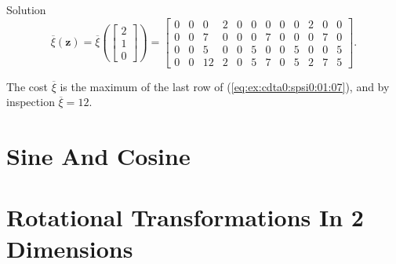 \begin{vworkexampleparsection}{Solution}
\begin{equation}
\label{eq:ex:cdta0:spsi0:01:07}
\overline{\xi}(\mathbf{z})
= 
\overline{\xi}\left(\left[\begin{array}{c}2\\1\\0\end{array}\right]\right)
=
\left[
\begin{array}{rrrrrrrrrrrr}
 0 &  0 &  0 &  2 &  0 &  0 &  0 &  0 &  0 &  2 &  0 &  0 \\
 0 &  0 &  7 &  0 &  0 &  0 &  7 &  0 &  0 &  0 &  7 &  0 \\
 0 &  0 &  5 &  0 &  0 &  5 &  0 &  0 &  5 &  0 &  0 &  5 \\
 0 &  0 & 12 &  2 &  0 &  5 &  7 &  0 &  5 &  2 &  7 &  5
\end{array}
\right]
.
\end{equation}

The cost $\overline{\xi}$ is the maximum of the last row of (\ref{eq:ex:cdta0:spsi0:01:07}),
and by inspection $\overline{\xi} = 12$.
\end{vworkexampleparsection}
\vworkexamplefooter{}



\section{Sine And Cosine}
\label{cdta0:ssco0}



\section{Rotational Transformations In 2 Dimensions}
\label{cdta0:srtr2}


